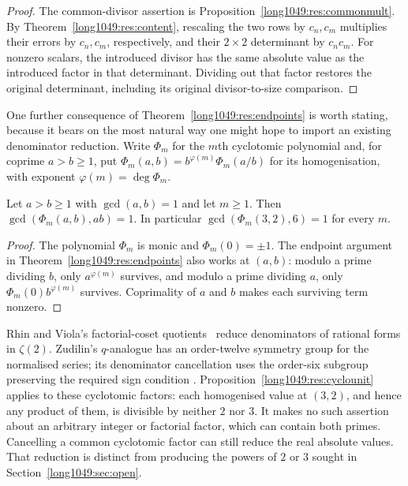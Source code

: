 \begin{proof}
The common-divisor assertion is Proposition~\ref{long1049:res:commonmult}.
By Theorem~\ref{long1049:res:content}, rescaling the two rows by
$c_n,c_m$ multiplies their errors by $c_n,c_m$, respectively, and
their $2\times2$ determinant by $c_nc_m$. For nonzero scalars, the
introduced divisor has the same absolute value as the introduced
factor in that determinant. Dividing out that factor restores the
original determinant, including its original divisor-to-size comparison.
\end{proof}

One further consequence of Theorem~\ref{long1049:res:endpoints} is worth stating,
because it bears on the most natural way one might hope to import an existing
denominator reduction.  Write $\Phi_m$ for the $m$th cyclotomic polynomial and,
for coprime $a>b\ge1$, put $\Phi_m(a,b)=b^{\varphi(m)}\Phi_m(a/b)$ for its
homogenisation, with exponent $\varphi(m)=\deg\Phi_m$.

\begin{proposition}
\label{long1049:res:cyclounit}
Let $a>b\ge1$ with $\gcd(a,b)=1$ and let $m\ge1$.  Then
$\gcd(\Phi_m(a,b),ab)=1$.  In particular $\gcd(\Phi_m(3,2),6)=1$ for every $m$.
\end{proposition}

\begin{proof}
The polynomial $\Phi_m$ is monic and $\Phi_m(0)=\pm1$. The endpoint
argument in Theorem~\ref{long1049:res:endpoints} also works at $(a,b)$:
modulo a prime dividing $b$, only $a^{\varphi(m)}$ survives, and
modulo a prime dividing $a$, only $\Phi_m(0)b^{\varphi(m)}$ survives.
Coprimality of $a$ and $b$ makes each surviving term nonzero.
\end{proof}

Rhin and Viola's factorial-coset quotients~\cite{rhinviola1996}
reduce denominators of rational forms in $\zeta(2)$. Zudilin's
$q$-analogue has an order-twelve symmetry group for the normalised
series; its denominator cancellation uses the order-six subgroup
preserving the required sign condition
\cite[Sec.~4, pp.~159--161]{zudilin2004}.
Proposition~\ref{long1049:res:cyclounit} applies to these cyclotomic
factors: each homogenised value at $(3,2)$, and hence any product of
them, is divisible by neither $2$ nor $3$. It makes no such assertion
about an arbitrary integer or factorial factor, which can contain
both primes. Cancelling a common cyclotomic factor can still reduce
the real absolute values. That reduction is distinct from producing
the powers of $2$ or $3$ sought in Section~\ref{long1049:sec:open}.

